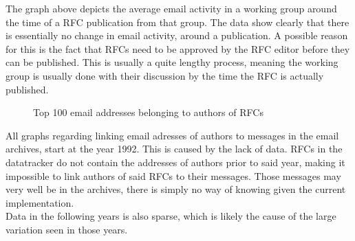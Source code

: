 \documentclass[a4paper,english]{report}
\begin{document}
The graph above depicts the average email activity in a working group around the time of a RFC publication from that group. The data show clearly that there is essentially no change in email activity, around a publication. A possible reason for this is the fact that RFCs need to be approved by the RFC editor before they can be published. This is usually a quite lengthy process, meaning the working group is usually done with  their discussion by the time the RFC is actually published. 






\begin{figure}[H]
\hspace*{-0.5cm}
\centering
{}
\caption{Top 100 email addresses belonging to authors of RFCs}
\end{figure}

All graphs regarding linking email adresses of authors to messages in the email archives, start at the year 1992. This is caused by the lack of data. RFCs in the datatracker do not contain the addresses of authors prior to said year, making it impossible to link authors of said RFCs to their messages. Those messages may very well be in the archives, there is simply no way of knowing given the current implementation.\\  
Data in the following years is also sparse, which is likely the cause of the large variation seen in those years.\\
\end{document}
